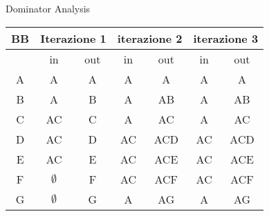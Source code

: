 \documentclass{article}
\begin{document}
\begin{section}{Dominator Analysis}
\begin{longtable}{| c | c | c | c | c | c | c |}
	\hline
	\textbf{BB} & \multicolumn{2}{|c|}{\textbf{Iterazione 1}} & 	\multicolumn{2}{|c|}{\textbf{iterazione 2}} & 	\multicolumn{2}{|c|}{\textbf{iterazione 3}} \\
	\hline
	\space & in & out & in & out & in & out \\
	\hline
	A & A & A & A & A & A & A\\
	\hline
	B & A & B & A & AB & A & AB \\
	\hline
	C & AC & C & A & AC & A & AC \\
	\hline
	D & AC & D & AC & ACD & AC & ACD \\
	\hline
	E & AC & E & AC & ACE & AC & ACE \\
	\hline
	F & $\emptyset$ & F & AC & ACF & AC & ACF \\
	\hline
	G & $\emptyset$ & G & A & AG & A & AG \\
	\hline
\end{longtable}
\end{section}
\pagebreak
\end{document}
